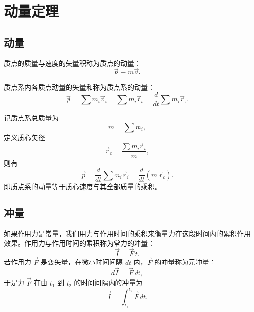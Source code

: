 \section{动量定理}

\subsection{动量}

\begin{definition}[动量]
质点的质量与速度的矢量积称为质点的动量：
\begin{equation}\label{eq:11-momentum-particle}
  \vec{p}=m\vec{v}.
\end{equation}
\end{definition}

质点系内各质点动量的矢量和称为质点系的动量：
\begin{equation}\label{eq:11-momentum-system}
  \vec{p}=\sum m_i\vec{v}_i=\sum m_i\dot{\vec{r}}_i=\frac{d}{dt}\sum m_i\vec{r}_i.
\end{equation}

记质点系总质量为
\begin{equation}\label{eq:11-mass-total}
  m=\sum m_i,
\end{equation}
定义质心矢径
\begin{equation}\label{eq:11-radius-center}
  \vec{r}_c=\frac{\sum m_i\vec{r}_i}{m},
\end{equation}
则有
\begin{equation}\label{eq:11-momentum-center}
  \vec{p}=\frac{d}{dt}\sum m_i\vec{r}_i=\frac{d}{dt}\left(m\,\vec{r}_c\right).
\end{equation}
即质点系的动量等于质心速度与其全部质量的乘积。

\subsection{冲量}

\begin{definition}[冲量]
如果作用力是常量，我们用力与作用时间的乘积来衡量力在这段时间内的累积作用效果。作用力与作用时间的乘积称为常力的冲量：
\begin{equation}\label{eq:11-impulse-constant}
  \vec{I}=\vec{F}\,t.
\end{equation}
若作用力 $\vec{F}$ 是变矢量，在微小时间间隔 $dt$ 内，$\vec{F}$ 的冲量称为元冲量：
\begin{equation}\label{eq:11-impulse-element}
  d\vec{I}=\vec{F}\,dt,
\end{equation}
于是力 $\vec{F}$ 在由 $t_1$ 到 $t_2$ 的时间间隔内的冲量为
\begin{equation}\label{eq:11-impulse-integral}
  \vec{I}=\int_{t_1}^{t_2}\vec{F}\,dt.
\end{equation}
\end{definition}

